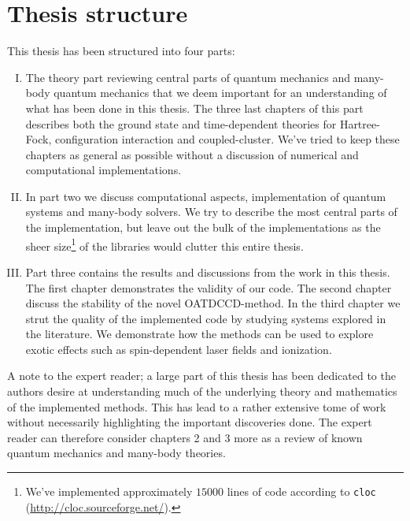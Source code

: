     \section{Thesis structure}
        This thesis has been structured into four parts:
        \begin{enumerate}[I.]
            \item The theory part reviewing central parts of quantum mechanics
                and many-body quantum mechanics that we deem important for an
                understanding of what has been done in this thesis.
                The three last chapters of this part describes both the ground
                state and time-dependent theories for Hartree-Fock,
                configuration interaction and coupled-cluster.
                We've tried to keep these chapters as general as possible
                without a discussion of numerical and computational
                implementations.
            \item In part two we discuss computational aspects, implementation
                of quantum systems and many-body solvers.
                We try to describe the most central parts of the implementation,
                but leave out the bulk of the implementations as the sheer
                size\footnote{%
                    We've implemented approximately $15000$ lines of code
                    according to \texttt{cloc}
                    (\url{http://cloc.sourceforge.net/}).
                }
                of the libraries would clutter this entire thesis.
            \item Part three contains the results and discussions from the work
                in this thesis.
                The first chapter demonstrates the validity of our code.
                The second chapter discuss the stability of the novel
                OATDCCD-method.
                In the third chapter we strut the quality of the implemented
                code by studying systems explored in the literature.
                We demonstrate how the methods can be used to explore exotic
                effects such as spin-dependent laser fields and ionization.
        \end{enumerate}
        A note to the expert reader; a large part of this thesis has been
        dedicated to the authors desire at understanding much of the underlying
        theory and mathematics of the implemented methods.
        This has lead to a rather extensive tome of work without necessarily
        highlighting the important discoveries done.
        The expert reader can therefore consider chapters 2 and 3 more as a
        review of known quantum mechanics and many-body theories.

